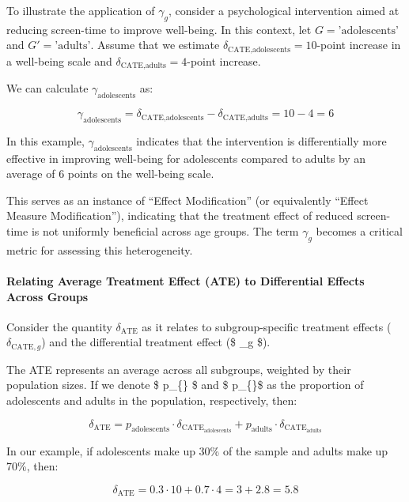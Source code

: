 \documentclass[
  singlecolumn]{article}
\let\oldparagraph\paragraph
\renewcommand{\paragraph}[1]{\oldparagraph{#1}\mbox{}}
\begin{document}
To illustrate the application of \(\gamma_g\), consider a psychological
intervention aimed at reducing screen-time to improve well-being. In
this context, let \(G = \text{'adolescents'}\) and
\(G' = \text{'adults'}\). Assume that we estimate
\(\delta_{\text{CATE}, \text{adolescents}} = 10\)-point increase in a
well-being scale and \(\delta_{\text{CATE}, \text{adults}} = 4\)-point
increase.

We can calculate \(\gamma_{\text{adolescents}}\) as:

\[
\gamma_{\text{adolescents}} = \delta_{\text{CATE}, \text{adolescents}} - \delta_{\text{CATE}, \text{adults}} = 10 - 4 = 6
\]

In this example, \(\gamma_{\text{adolescents}}\) indicates that the
intervention is differentially more effective in improving well-being
for adolescents compared to adults by an average of 6 points on the
well-being scale.

This serves as an instance of ``Effect Modification'' (or equivalently
``Effect Measure Modification''), indicating that the treatment effect
of reduced screen-time is not uniformly beneficial across age groups.
The term \(\gamma_g\) becomes a critical metric for assessing this
heterogeneity.

\paragraph{Relating Average Treatment Effect (ATE) to Differential
Effects Across
Groups}\label{relating-average-treatment-effect-ate-to-differential-effects-across-groups}

Consider the quantity \(\delta_{\text{ATE}}\) as it relates to
subgroup-specific treatment effects (\(\delta_{\text{CATE},g}\)) and the
differential treatment effect (\$ \gamma\_g \$).

The ATE represents an average across all subgroups, weighted by their
population sizes. If we denote \$ p\_\{\} \$ and \$
p\_\{\}\$ as the proportion of adolescents and adults in
the population, respectively, then:

\[
\delta_{\text{ATE}} = p_{\text{adolescents}} \cdot \delta_{\text{CATE}_{\text{adolescents}}} + p_{\text{adults}} \cdot \delta_{\text{CATE}_{\text{adults}}}
\]

In our example, if adolescents make up 30\% of the sample and adults
make up 70\%, then:

\[
\delta_{\text{ATE}} = 0.3 \cdot 10 + 0.7 \cdot 4 = 3 + 2.8 = 5.8
\]
\end{document}
